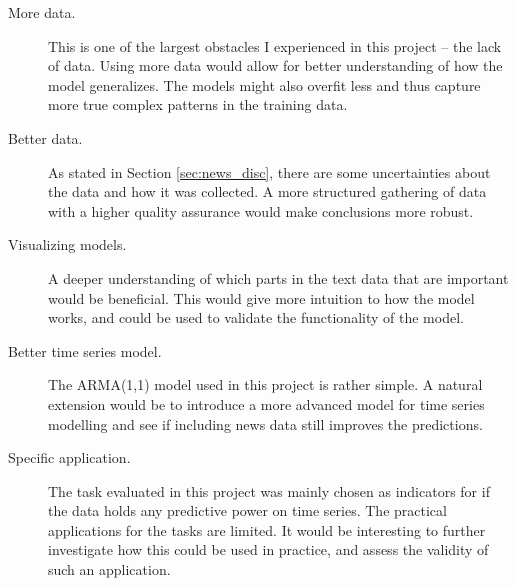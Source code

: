 \begin{description}
    \item[More data.] This is one of the largest obstacles I experienced in this project -- the lack of data. Using more data would allow for better understanding of how the model generalizes. The models might also overfit less and thus capture more true complex patterns in the training data. 
    \item[Better data. ] As stated in Section \ref{sec:news_disc}, there are some uncertainties about the data and how it was collected. A more structured gathering of data with a higher quality assurance would make conclusions more robust. 
    \item[Visualizing models.] A deeper understanding of which parts in the text data that are important would be beneficial. This would give more intuition to how the model works, and could be used to validate the functionality of the model.
    \item[Better time series model.] The ARMA(1,1) model used in this project is rather simple. A natural extension would be to introduce a more advanced model for time series modelling and see if including news data still improves the predictions. 
    \item[Specific application.] The task evaluated in this project was mainly chosen as indicators for if the data holds any predictive power on time series. The practical applications for the tasks are limited. It would be interesting to further investigate how this could be used in practice, and assess the validity of such an application. 
\end{description}
